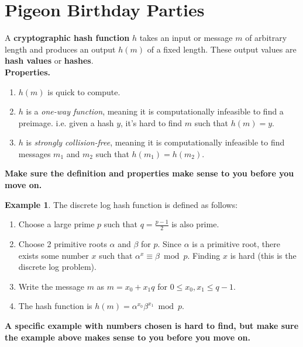 \documentclass[12pt]{amsart}
\theoremstyle{plain}
\theoremstyle{definition}
\newtheorem*{ex}{Example}
\theoremstyle{remark}
\begin{document}
\section{Pigeon Birthday Parties}
\begin{framed}
\noindent A \textbf{cryptographic hash function} $h$ takes an input or message $m$ of arbitrary length and produces an output $h(m)$ of a fixed length.  These output values are \textbf{hash values} or \textbf{hashes}.\\

\noindent \textbf{Properties.}
\begin{enumerate}[1.]
	\item $h(m)$ is quick to compute.
	\item $h$ is a \emph{one-way function}, meaning it is computationally infeasible to find a preimage.  i.e. given a hash $y$, it's hard to find $m$ such that $h(m) = y$.
	\item $h$ is \emph{strongly collision-free}, meaning it is computationally infeasible to find messages $m_1$ and $m_2$ such that $h(m_1) = h(m_2)$.
\end{enumerate}
\end{framed}

\begin{center}
\textbf{Make sure the definition and properties make sense to you before you move on.}
\end{center}

\begin{ex}
The discrete log hash function is defined as follows:\
\begin{enumerate}[1.]
	\item Choose a large prime $p$ such that $q = \frac{p-1}{2}$ is also prime.
	\item Choose 2 primitive roots $\alpha$ and $\beta$ for $p$.  Since $\alpha$ is a primitive root, there exists some number $x$ such that $\alpha^x \equiv \beta \bmod p$.  Finding $x$ is hard (this is the discrete log problem).
	\item Write the message $m$ as $m = x_0 + x_1 q$ for $0 \leq x_0, x_1 \leq q-1$.
	\item The hash function is $h(m) = \alpha^{x_0}\beta^{x_1} \bmod p$.
\end{enumerate}
\end{ex}

\begin{center}
\textbf{A specific example with numbers chosen is hard to find, but make sure the example above makes sense to you before you move on.}
\end{center}
\end{document}
